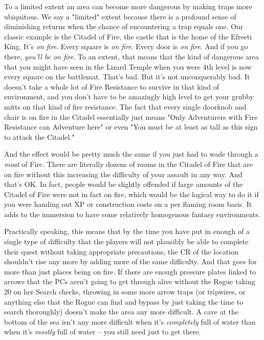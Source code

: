 To a limited extent an area can become more dangerous by making traps more ubiquitous. We say a "limited" extent because there is a profound sense of diminishing returns when the chance of encountering a trap equals one. Our classic example is the Citadel of Fire, the castle that is the home of the Efreeti King. It's \textit{on fire}. Every square is \textit{on fire}. Every door is \textit{on fire}. And if you go there, \textit{you'll be on fire}. To an extent, that means that the kind of dangerous area that you might have seen in the Lizard Temple when you were 4th level is now every square on the battlemat. That's bad. But it's not unconquerably bad. It doesn't take a whole lot of Fire Resistance to survive in that kind of environment, and you don't have to be amazingly high level to get your grubby mitts on that kind of fire resistance. The fact that every single doorknob and chair is on fire in the Citadel essentially just means "Only Adventurers with Fire Resistance can Adventure here" or even "You must be at least as tall as this sign to attack the Citadel."

And the effect would be pretty much the same if you just had to wade through a \textit{moat} of Fire. There are literally dozens of rooms in the Citadel of Fire that are on fire without this increasing the difficulty of your assault in any way. And that's OK. In fact, people would be slightly offended if large amounts of the Citadel of Fire were not in fact on fire, which would be the logical way to do it if you were handing out XP or construction costs on a per flaming room basis. It adds to the immersion to have some relatively homogenous fantasy environments.

Practically speaking, this means that by the time you have put in enough of a single type of difficulty that the players will not plausibly be able to complete their quest without taking appropriate precautions, the CR of the location shouldn't rise any more by adding more of the same difficulty. And that goes for more than just places being on fire. If there are enough pressure plates linked to arrows that the PCs aren't going to get through alive without the Rogue taking 20 on her Search checks, throwing in some more arrow traps (or tripwires, or anything else that the Rogue can find and bypass by just taking the time to search thoroughly) doesn't make the area any more difficult. A cave at the bottom of the sea isn't any more difficult when it's \textit{completely} full of water than when it's \textit{mostly} full of water -- you still need  just to get there.

